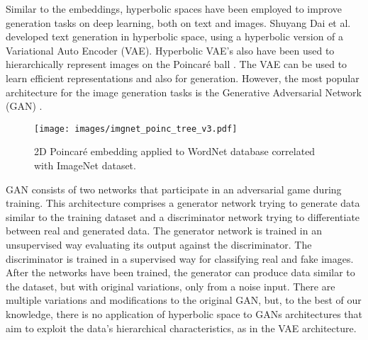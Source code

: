 \documentclass[journal]{IEEEtran}
\begin{document}
Similar to the embeddings, hyperbolic spaces have been employed to improve generation tasks on deep learning, both on text and images. Shuyang Dai et al. \cite{hyp_text_generation} developed text generation in hyperbolic space, using a hyperbolic version of a Variational Auto Encoder (VAE). Hyperbolic VAE's also have been used to hierarchically represent images on the Poincaré ball \cite{poinc_vae} \cite{wrapped_normal_hyp}. The VAE can be used to learn efficient representations and also for generation. However, the most popular architecture for the image generation tasks is the Generative Adversarial Network (GAN) \cite{gan}.\newline

\begin{figure}[t]
\begin{center}
\texttt{[image: images/imgnet\_poinc\_tree\_v3.pdf]}
  \caption{2D Poincaré embedding applied to WordNet database correlated with ImageNet dataset.}
  \label{poincare_embedding}
\end{center}
\end{figure}

GAN consists of two networks that participate in an adversarial game during training. This architecture comprises a generator network trying to generate data similar to the training dataset and a discriminator network trying to differentiate between real and generated data. The generator network is trained in an unsupervised way evaluating its output against the discriminator. The discriminator is trained in a supervised way for classifying real and fake images. After the networks have been trained, the generator can produce data similar to the dataset, but with original variations,  only from a noise input. There are multiple variations and modifications to the original GAN, but, to the best of our knowledge, there is no application of hyperbolic space to GANs architectures that aim to exploit the data's hierarchical characteristics, as in the VAE architecture.\newline
\begin{comment}
PROBAMOS REDES HYPERBOLICAS EN ARQUITECTURAS GAN----
QUE DESAROLLAMOS 3 REDES hga, hcgan, hwgan----
y que obtuvimos mejoras en cada una de ellas en alguna arquitectura---
haber reportado una gran cantidad de redes, probado exhustivamente con muchas combinacione de redes\newline

\end{comment}
\end{document}
